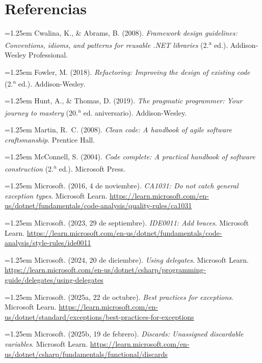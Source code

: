 \section{Referencias}

\noindent\hangindent=1.25em Cwalina, K., \& Abrams, B. (2008). \textit{Framework design guidelines: Conventions, idioms, and patterns for reusable .NET libraries} (2.\textsuperscript{a} ed.). Addison-Wesley Professional.

\smallskip
\noindent\hangindent=1.25em Fowler, M. (2018). \textit{Refactoring: Improving the design of existing code} (2.\textsuperscript{a} ed.). Addison-Wesley.

\smallskip
\noindent\hangindent=1.25em Hunt, A., \& Thomas, D. (2019). \textit{The pragmatic programmer: Your journey to mastery} (20.\textsuperscript{a} ed. aniversario). Addison-Wesley.

\smallskip
\noindent\hangindent=1.25em Martin, R.~C. (2008). \textit{Clean code: A handbook of agile software craftsmanship}. Prentice Hall.

\smallskip
\noindent\hangindent=1.25em McConnell, S. (2004). \textit{Code complete: A practical handbook of software construction} (2.\textsuperscript{a} ed.). Microsoft Press.

\smallskip
\noindent\hangindent=1.25em Microsoft. (2016, 4 de noviembre). \textit{CA1031: Do not catch general exception types}. Microsoft Learn. \url{https://learn.microsoft.com/en-us/dotnet/fundamentals/code-analysis/quality-rules/ca1031}

\smallskip
\noindent\hangindent=1.25em Microsoft. (2023, 29 de septiembre). \textit{IDE0011: Add braces}. Microsoft Learn. \url{https://learn.microsoft.com/en-us/dotnet/fundamentals/code-analysis/style-rules/ide0011}

\smallskip
\noindent\hangindent=1.25em Microsoft. (2024, 20 de diciembre). \textit{Using delegates}. Microsoft Learn. \url{https://learn.microsoft.com/en-us/dotnet/csharp/programming-guide/delegates/using-delegates}

\smallskip
\noindent\hangindent=1.25em Microsoft. (2025a, 22 de octubre). \textit{Best practices for exceptions}. Microsoft Learn. \url{https://learn.microsoft.com/en-us/dotnet/standard/exceptions/best-practices-for-exceptions}

\smallskip
\noindent\hangindent=1.25em Microsoft. (2025b, 19 de febrero). \textit{Discards: Unassigned discardable variables}. Microsoft Learn. \url{https://learn.microsoft.com/en-us/dotnet/csharp/fundamentals/functional/discards}

